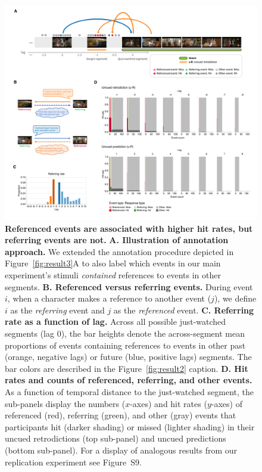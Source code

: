 \documentclass[10pt]{article}
\newcommand{\referringReferenced}{S9}
\begin{document}
\begin{figure}[tp]
  \centering
  \includegraphics[width=\textwidth]{results5}
  \caption{\textbf{Referenced events are associated with higher hit rates, but referring events are not.}  \textbf{A. Illustration of annotation approach.}  We extended the annotation procedure depicted in Figure~\ref{fig:result3}A to also label which events in our main experiment's stimuli \textit{contained} references to events in other segments.  \textbf{B. Referenced versus referring events.}  During event $i$, when a character makes a reference to another event ($j$), we define $i$ as the \textit{referring} event and $j$ as the \textit{referenced} event.  \textbf{C.  Referring rate as a function of lag.}  Across all possible just-watched segments (lag 0), the bar heights denote the across-segment mean proportions of events containing references to events in other past (orange, negative lags) or future (blue, positive lags) segments.  The bar colors are described in the Figure~\ref{fig:result2} caption.  \textbf{D. Hit rates and counts of referenced, referring, and other events.}  As a function of temporal distance to the just-watched segment, the sub-panels display the numbers ($x$-axes) and hit rates ($y$-axes) of referenced (red), referring (green), and other (gray) events that participants hit (darker shading) or missed (lighter shading) in their uncued retrodictions (top sub-panel) and uncued predictions (bottom sub-panel). For a display of analogous results from our replication experiment see Figure~\referringReferenced.}
  \label{fig:result5}
\end{figure}
\end{document}
